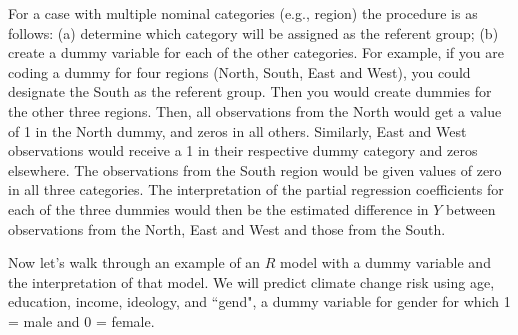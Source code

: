 \documentclass[11pt,openany]{book}\usepackage[]{graphicx}\usepackage[]{color}
\begin{document}
{For a case with multiple nominal categories (e.g., region) the procedure is as follows: (a) determine which category will be assigned as the referent group; (b) create a dummy variable for each of the other categories. For example, if you are coding a dummy for four regions (North, South, East and West), you could designate the South as the referent group. Then you would create dummies for the other three regions. Then, all observations from
the North would get a value of 1 in the North dummy, and zeros in all others. Similarly, East and West observations would receive a 1 in their respective dummy category and zeros elsewhere. The observations from the South region would be given values of zero in all three categories. The interpretation of the partial regression coefficients for each of the three dummies would then be the estimated difference in $Y$ between observations from the North, East and West and those from the South.

Now let's walk through an example of an $R$ model with a dummy variable and the interpretation of that model. We will predict climate change risk using age, education, income, ideology, and ``gend", a dummy variable for gender for which 1 = male and 0 = female. 


}
\end{document}
